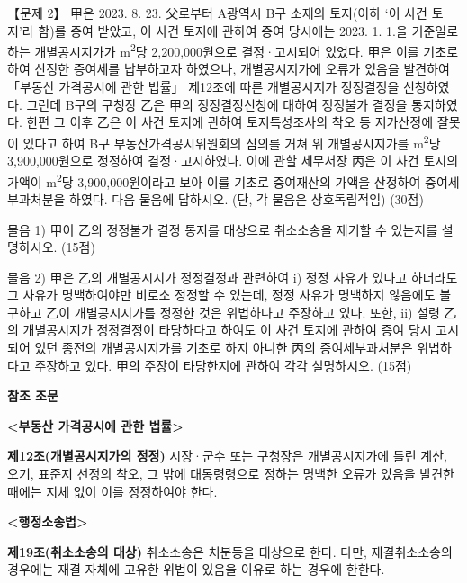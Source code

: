 \begin{longquestion}{【문제 2】}
甲은 2023. 8. 23. 父로부터 A광역시 B구 소재의 토지(이하 ‘이 사건 토지’라 함)를 증여 받았고, 이 사건 토지에 관하여 증여 당시에는 2023. 1. 1.을 기준일로 하는 개별공시지가가 m\textsuperscript{2}당 2,200,000원으로 결정·고시되어 있었다. 甲은 이를 기초로 하여 산정한 증여세를 납부하고자 하였으나, 개별공시지가에 오류가 있음을 발견하여 「부동산 가격공시에 관한 법률」 제12조에 따른 개별공시지가 정정결정을 신청하였다. 그런데 B구의 구청장 乙은 甲의 정정결정신청에 대하여 정정불가 결정을 통지하였다. 한편 그 이후 乙은 이 사건 토지에 관하여 토지특성조사의 착오 등 지가산정에 잘못이 있다고 하여 B구 부동산가격공시위원회의 심의를 거쳐 위 개별공시지가를 m\textsuperscript{2}당 3,900,000원으로 정정하여 결정·고시하였다. 이에 관할 세무서장 丙은 이 사건 토지의 가액이 m\textsuperscript{2}당 3,900,000원이라고 보아 이를 기초로 증여재산의 가액을 산정하여 증여세부과처분을 하였다. 다음 물음에 답하시오. (단, 각 물음은 상호독립적임) (30점) \par
\medskip\noindent 물음 1) 甲이 乙의 정정불가 결정 통지를 대상으로 취소소송을 제기할 수 있는지를 설명하시오. (15점) \par
\medskip\noindent 물음 2) 甲은 乙의 개별공시지가 정정결정과 관련하여 i) 정정 사유가 있다고 하더라도 그 사유가 명백하여야만 비로소 정정할 수 있는데, 정정 사유가 명백하지 않음에도 불구하고 乙이 개별공시지가를 정정한 것은 위법하다고 주장하고 있다. 또한, ii) 설령 乙의 개별공시지가 정정결정이 타당하다고 하여도 이 사건 토지에 관하여 증여 당시 고시되어 있던 종전의 개별공시지가를 기초로 하지 아니한 丙의 증여세부과처분은 위법하다고 주장하고 있다. 甲의 주장이 타당한지에 관하여 각각 설명하시오. (15점) \par
\medskip
\begin{framedtext}
\textbf{참조 조문} \par
\textbf{<부동산 가격공시에 관한 법률>} \par
\textbf{제12조(개별공시지가의 정정)} 시장·군수 또는 구청장은 개별공시지가에 틀린 계산, 오기, 표준지 선정의 착오, 그 밖에 대통령령으로 정하는 명백한 오류가 있음을 발견한 때에는 지체 없이 이를 정정하여야 한다. \par
\textbf{<행정소송법>} \par
\textbf{제19조(취소소송의 대상)} 취소소송은 처분등을 대상으로 한다. 다만, 재결취소소송의 경우에는 재결 자체에 고유한 위법이 있음을 이유로 하는 경우에 한한다. \par
\end{framedtext}
\end{longquestion}
